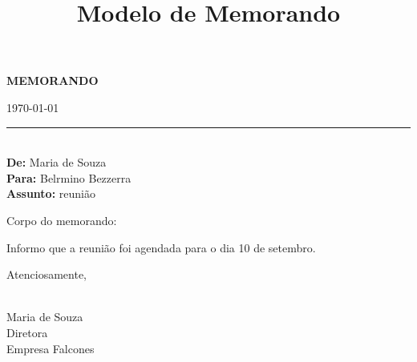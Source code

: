 \documentclass[a4paper,12pt]{article}
\title{Modelo de Memorando}
\author{}
\date{}
\begin{document}
\begin{center}
    \textbf{MEMORANDO}
\end{center}

\bigskip

\begin{flushright}
    \today \\
    \rule{5cm}{0.4pt} \\
    \textbf{De:} Maria de Souza \\
    \textbf{Para:} Belrmino Bezzerra \\
    \textbf{Assunto:} reunião
\end{flushright}

\bigskip

Corpo do memorando:

\bigskip

Informo que a reunião foi agendada para o dia 10 de setembro.

\bigskip

Atenciosamente,

\bigskip

\hrulefill \\
Maria de Souza \\
Diretora \\
Empresa Falcones
\end{document}

